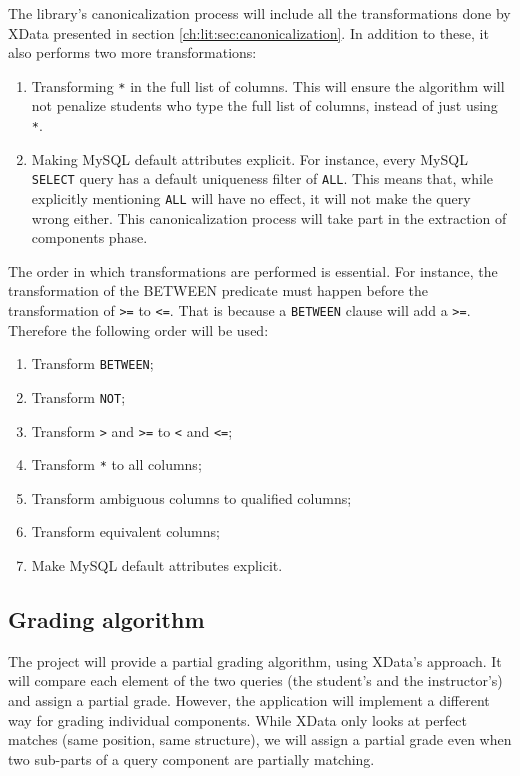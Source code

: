 The library's canonicalization process will include all the transformations done by XData presented in section \ref{ch:lit:sec:canonicalization}. In addition to these, it also performs two more transformations:
\begin{enumerate}
    \item Transforming \texttt{*} in the full list of columns. This will ensure the algorithm will not penalize students who type the full list of columns, instead of just using  \texttt{*}.
    \item Making MySQL default attributes explicit. For instance, every MySQL \texttt{SELECT} query has a default uniqueness filter of \texttt{ALL}. This means that, while explicitly mentioning \texttt{ALL} will have no effect, it will not make the query wrong either. This canonicalization process will take part in the extraction of components phase.
\end{enumerate}

The order in which transformations are performed is essential. For instance, the transformation of the BETWEEN predicate must happen before the transformation of \texttt{>=} to \texttt{<=}. That is because a \texttt{BETWEEN} clause will add a \texttt{>=}. Therefore the following order will be used:
\begin{enumerate}
    \item Transform \texttt{BETWEEN};
    \item Transform \texttt{NOT};
    \item Transform \texttt{>} and \texttt{>=} to \texttt{<} and \texttt{<=};
    \item Transform \texttt{*} to all columns;
    \item Transform ambiguous columns to qualified columns;
    \item Transform equivalent columns;
    \item Make MySQL default attributes explicit.
\end{enumerate}

\subsection{Grading algorithm} \label{ch:des:grading}

The project will provide a partial grading algorithm, using XData's approach. It will compare each element of the two queries (the student's and the instructor's) and assign a partial grade. However, the application will implement a different way for grading individual components. While XData only looks at perfect matches (same position, same structure), we will assign a partial grade even when two sub-parts of a query component are partially matching.

